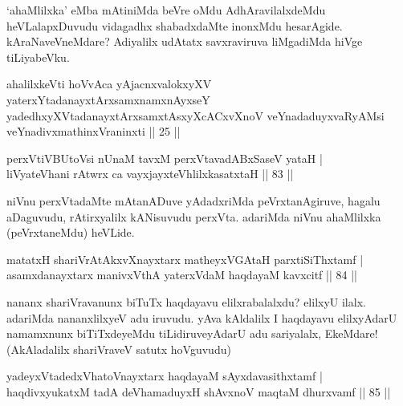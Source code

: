 \begin{artha}
`ahaMlilxka' eMba mAtiniMda beVre oMdu AdhAravilalxdeMdu heVLalapxDuvudu vidagadhx shabadxdaMte inonxMdu hesarAgide. kAraNaveVneMdare? Adiyalilx udAtatx savxraviruva liMgadiMda hiVge tiLiyabeVku.
\end{artha}

\begin{shl}
ahalilxkeVti hoVvAca yAjacnxvalokxyXV yaterxYtadanayxtArxsamxnamxnAyxseY yadedhxyXVtadanayxtArxsamxtAsxyXcACxvXnoV veYnadaduyxvaRyAMsi veYnadivxmathinxVraninxti || 25 ||
\end{shl}


\begin{shl}
perxVtiVBUtoV\s si nUnaM tavxM perxVtavadABxSaseV yataH |\\
liVyateV\s hani rAtwrx ca vayxjayxteV\s hlilxkasatxtaH \hfill || 83 ||
\end{shl}

\begin{artha}
niVnu perxVtadaMte mAtanADuve yAdadxriMda peVrxtanAgiruve, hagalu aDaguvudu, rAtirxyalilx kANisuvudu perxVta. adariMda niVnu ahaMlilxka (peVrxtaneMdu) heVLide.
\end{artha}


\begin{shl}
matatxH shariVrAtAkxvXnayxtarx matheyxVGAtaH parxtiSiThxtamf |\\
asamxdanayxtarx manivxVthA yaterxVdaM \footnotemark[1]{}haqdayaM kavxcitf \hfill || 84 ||
\end{shl}

\begin{artha}
nananx shariVravanunx biTuTx haqdayavu elilxrabalalxdu? elilxyU ilalx. adariMda nananxlilxyeV adu iruvudu. yAva kAldalilx I haqdayavu elilxyAdarU namamxnunx biTiTxdeyeMdu tiLidiruveyAdarU adu sariyalalx, EkeMdare! (AkAladalilx shariVraveV satutx hoVguvudu)
\end{artha}


\begin{shl}
yadeyxVtadedxVhatoV\s nayxtarx haqdayaM sAyxdavasithxtamf |\\
haqdivxyukatxM tadA deVhamaduyxH shAvxnoV maqtaM dhurxvamf \hfill || 85 ||
\end{shl}

